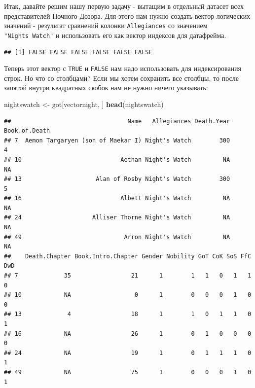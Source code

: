 \documentclass[]{book}
\newenvironment{Shaded}{\begin{snugshade}}{\end{snugshade}}
\newcommand{\KeywordTok}[1]{\textcolor[rgb]{0.13,0.29,0.53}{\textbf{#1}}}
\newcommand{\StringTok}[1]{\textcolor[rgb]{0.31,0.60,0.02}{#1}}
\newcommand{\OperatorTok}[1]{\textcolor[rgb]{0.81,0.36,0.00}{\textbf{#1}}}
\newcommand{\NormalTok}[1]{#1}
\begin{document}
Итак, давайте решим нашу первую задачу - вытащим в отдельный датасет
всех представителей Ночного Дозора. Для этого нам нужно создать вектор
логических значений - результат сравнений колонки \texttt{Allegiances}
со значением \texttt{"Night\textquotesingle{}s\ Watch"} и использовать
его как вектор индексов для датафрейма.

\begin{Shaded}
\end{Shaded}

\begin{verbatim}
## [1] FALSE FALSE FALSE FALSE FALSE FALSE
\end{verbatim}

Теперь этот вектор с \texttt{TRUE} и \texttt{FALSE} нам надо
использовать для индексирования строк. Но что со столбцами? Если мы
хотем сохранить все столбцы, то после запятой внутри квадратных скобок
нам не нужно ничего указывать:

\begin{Shaded}
\begin{Highlighting}[]
\NormalTok{nightswatch <-}\StringTok{ }\NormalTok{got[vectornight, ]}
\KeywordTok{head}\NormalTok{(nightswatch)}
\end{Highlighting}
\end{Shaded}

\begin{verbatim}
##                                 Name   Allegiances Death.Year Book.of.Death
## 7  Aemon Targaryen (son of Maekar I) Night's Watch        300             4
## 10                            Aethan Night's Watch         NA            NA
## 13                     Alan of Rosby Night's Watch        300             5
## 16                            Albett Night's Watch         NA            NA
## 24                    Alliser Thorne Night's Watch         NA            NA
## 49                             Arron Night's Watch         NA            NA
##    Death.Chapter Book.Intro.Chapter Gender Nobility GoT CoK SoS FfC DwD
## 7             35                 21      1        1   1   0   1   1   0
## 10            NA                  0      1        0   0   0   1   0   0
## 13             4                 18      1        1   0   1   1   0   1
## 16            NA                 26      1        0   1   0   0   0   0
## 24            NA                 19      1        0   1   1   1   0   1
## 49            NA                 75      1        0   0   0   1   0   1
\end{verbatim}
\end{document}
